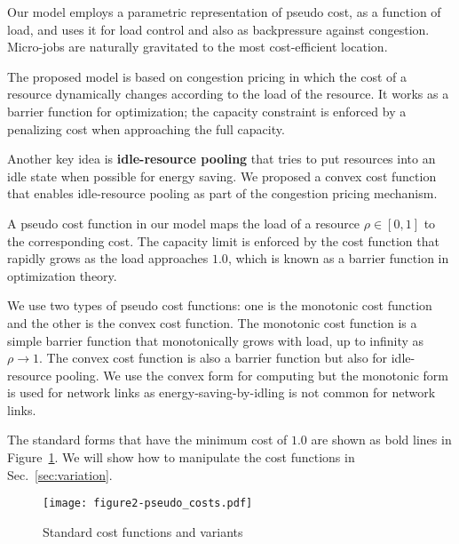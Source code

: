 
Our model employs a parametric representation of pseudo cost, as a
function of load, and uses it for load control and also as
backpressure against congestion.
Micro-jobs are naturally gravitated to the most cost-efficient
location.

The proposed model is based on congestion pricing in which the cost of
a resource dynamically changes according to the load of the resource.
It works as a barrier function for optimization; the capacity
constraint is enforced by a penalizing cost when approaching the full
capacity.

Another key idea is {\bf idle-resource pooling} that tries to put resources
into an idle state when possible for energy saving.
We proposed a convex cost function that enables idle-resource pooling
as part of the congestion pricing mechanism.

A pseudo cost function in our model maps the load of a resource
$\rho \in [0, 1]$ to the corresponding cost.
The capacity limit is enforced by the cost function that rapidly grows
as the load approaches $1.0$, which is known as a barrier function in
optimization theory.

We use two types of pseudo cost functions: one is the monotonic cost
function and the other is the convex cost function.
The monotonic cost function is a simple barrier function that
monotonically grows with load, up to infinity as $\rho \to 1$.
The convex cost function is also a barrier function but also for
idle-resource pooling.
We use the convex form for computing but the monotonic form
is used for network links as energy-saving-by-idling is not common for
network links.

The standard forms that have the minimum cost of $1.0$ are
shown as bold lines in Figure~\ref{fig:std_costfunc}. We will show how
to manipulate the cost functions in Sec.~\ref{sec:variation}.

\begin{figure}[tb]
  \begin{center}
    \texttt{[image: figure2-pseudo\_costs.pdf]}
    \vspace{-2.0ex}
    \caption{Standard cost functions and variants}
    \label{fig:std_costfunc}
  \end{center}
\end{figure}

